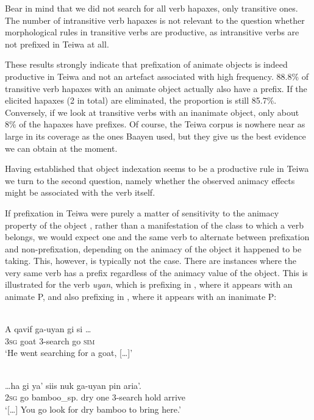 Bear in mind that we did not search for all verb hapaxes, only transitive ones. The number of intransitive verb hapaxes is not relevant to the question whether morphological rules in transitive verbs are productive, as intransitive verbs are not prefixed in Teiwa  at all.

These results strongly indicate that prefixation of animate objects is indeed productive in Teiwa  and not an artefact associated with high frequency. 88.8\% of transitive verb hapaxes with an animate object actually also have a prefix. If the elicited hapaxes (2 in total) are eliminated, the proportion is still 85.7\%. Conversely, if we look at transitive verbs with an inanimate object, only about 8\% of the hapaxes have prefixes. Of course, the Teiwa  corpus is nowhere near as large in its coverage as the ones Baayen used, but they give us the best evidence we can obtain at the moment.

Having established that object indexation seems to be a productive rule in Teiwa  we turn to the second question, namely whether the observed animacy effects might be associated with the verb itself. 

If prefixation in Teiwa  were purely a matter of sensitivity to the animacy  property of the object , rather than a manifestation of the class  to which a verb belongs, we would expect one and the same verb to alternate  between prefixation and non-prefixation, depending on the animacy of the object it happened to be taking. This, however, is typically not the case. There are instances where the very same verb has a prefix regardless of the animacy value of the object. This is illustrated for the verb \textit{uyan}, which is prefixing in , where it appears with an animate P, and also prefixing in , where it appears with an inanimate P:


\ea 
\label{ex:10:1241}
 \\ 
 \gll    A  qavif    ga-uyan  gi  si  \dots\\
    3\textsc{sg} goat  3-search  go  \textsc{sim} \\
 \glt `He went searching for a goat, [{\dots}]'

\z



\ea 
\label{ex:10:1242}
 \\ 
 \gll   \dots  ha        gi    ya'          siis nuk  ga-uyan   pin   aria'.\\
        {}  2\textsc{sg} go    bamboo\_sp.  dry  one  3-search  hold  arrive \\
 \glt `[{\dots}] You go look for dry bamboo to bring here.'   
\z

